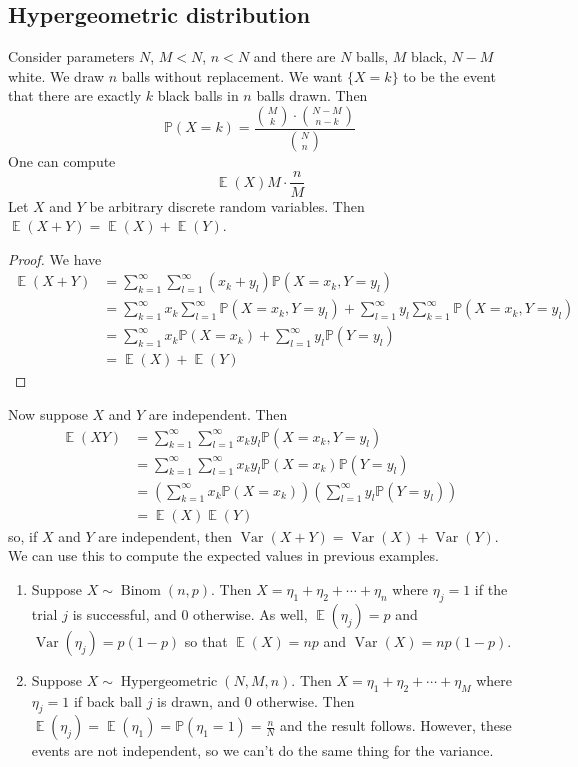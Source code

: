 \documentclass[12pt, a4paper]{book}
\DeclareMathOperator{\E}{\mathbb{E}}
\DeclareMathOperator{\Binom}{Binom}
\DeclareMathOperator{\Var}{Var}
\renewcommand{\Pr}{\mathbb{P}}
\theoremstyle{nonumberplain}
\newtheorem{proof}{Proof}
\begin{document}
\subsection{Hypergeometric distribution}
Consider parameters $N$, $M<N$, $n<N$ and there are $N$ balls, $M$ black, $N-M$ white.
We draw $n$ balls without replacement.
We want $\{X=k\}$ to be the event that there are exactly $k$ black balls in $n$ balls drawn.
Then
\[\Pr(X=k)=\frac{\binom{M}{k}\cdot\binom{N-M}{n-k}}{\binom{N}{n}}\]
One can compute
\[\E(X)M\cdot\frac{n}{M}\]
Let $X$ and $Y$ be arbitrary discrete random variables.
Then $\E(X+Y)=\E(X)+\E(Y)$.
\begin{proof}
    We have
    \begin{align*}
        \E(X+Y)&=\sum\limits_{k=1}^\infty\sum\limits_{l=1}^\infty(x_k+y_l)\Pr(X=x_k,Y=y_l)\\
               &=\sum\limits_{k=1}^\infty x_k\sum\limits_{l=1}^\infty\Pr(X=x_k,Y=y_l)+\sum\limits_{l=1}^\infty y_l\sum\limits_{k=1}^\infty\Pr(X=x_k,Y=y_l)\\
               &=\sum\limits_{k=1}^\infty x_k\Pr(X=x_k)+\sum\limits_{l=1}^\infty y_l\Pr(Y=y_l)\\
               &= \E(X)+\E(Y)
    \end{align*}
\end{proof}
Now suppose $X$ and $Y$ are independent.
Then
\begin{align*}
    \E(XY) &= \sum\limits_{k=1}^\infty\sum\limits_{l=1}^\infty x_ky_l\Pr(X=x_k,Y=y_l)\\
           &= \sum\limits_{k=1}^\infty\sum\limits_{l=1}^\infty x_ky_l\Pr(X=x_k)\Pr(Y=y_l)\\
           &= \left(\sum\limits_{k=1}^\infty x_k\Pr(X=x_k)\right)\left(\sum\limits_{l=1}^\infty y_l\Pr(Y=y_l)\right)\\
           &=\E(X)\E(Y)
\end{align*}
so, if $X$ and $Y$ are independent, then $\Var(X+Y)=\Var(X)+\Var(Y)$.
We can use this to compute the expected values in previous examples.
\begin{enumerate}
    \item Suppose $X\sim\Binom(n,p)$.
        Then $X=\eta_1+\eta_2+\cdots+\eta_n$ where $\eta_j=1$ if the trial $j$ is successful, and 0 otherwise.
        As well, $\E(\eta_j)=p$ and $\Var(\eta_j)=p(1-p)$ so that $\E(X)=np$ and $\Var(X)=np(1-p)$.
    \item Suppose $X\sim\operatorname{Hypergeometric}(N,M,n)$.
        Then $X=\eta_1+\eta_2+\cdots+\eta_M$ where $\eta_j=1$ if back ball $j$ is drawn, and $0$ otherwise.
        Then $\E(\eta_j)=\E(\eta_1)=\Pr(\eta_1=1)=\frac{n}{N}$ and the result follows.
        However, these events are not independent, so we can't do the same thing for the variance.
\end{enumerate}
\end{document}
